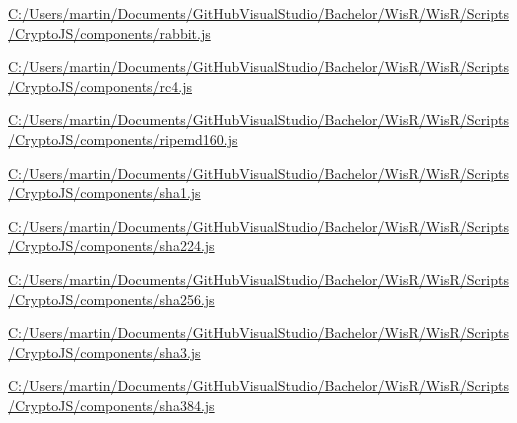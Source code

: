 \begin{DoxyCompactItemize}
\item 
\hyperlink{_c_1_2_users_2martin_2_documents_2_git_hub_visual_studio_2_bachelor_2_wis_r_2_wis_r_2_scripts_2_ceb1bf29ab1bbe291a99a8ab348a650e}{C\+:/\+Users/martin/\+Documents/\+Git\+Hub\+Visual\+Studio/\+Bachelor/\+Wis\+R/\+Wis\+R/\+Scripts/\+Crypto\+J\+S/components/rabbit.\+js}
\item 
\hyperlink{_c_1_2_users_2martin_2_documents_2_git_hub_visual_studio_2_bachelor_2_wis_r_2_wis_r_2_scripts_2_a7aef29039b205bc09138aca000fc420}{C\+:/\+Users/martin/\+Documents/\+Git\+Hub\+Visual\+Studio/\+Bachelor/\+Wis\+R/\+Wis\+R/\+Scripts/\+Crypto\+J\+S/components/rc4.\+js}
\item 
\hyperlink{_c_1_2_users_2martin_2_documents_2_git_hub_visual_studio_2_bachelor_2_wis_r_2_wis_r_2_scripts_2_6d6da44472d2f8d05f238172bf4c2766}{C\+:/\+Users/martin/\+Documents/\+Git\+Hub\+Visual\+Studio/\+Bachelor/\+Wis\+R/\+Wis\+R/\+Scripts/\+Crypto\+J\+S/components/ripemd160.\+js}
\item 
\hyperlink{_c_1_2_users_2martin_2_documents_2_git_hub_visual_studio_2_bachelor_2_wis_r_2_wis_r_2_scripts_2_53d3ce3bfd2c70be05e0b362863774c0}{C\+:/\+Users/martin/\+Documents/\+Git\+Hub\+Visual\+Studio/\+Bachelor/\+Wis\+R/\+Wis\+R/\+Scripts/\+Crypto\+J\+S/components/sha1.\+js}
\item 
\hyperlink{_c_1_2_users_2martin_2_documents_2_git_hub_visual_studio_2_bachelor_2_wis_r_2_wis_r_2_scripts_2_360301f8b63800a46bf88ed98ad6f540}{C\+:/\+Users/martin/\+Documents/\+Git\+Hub\+Visual\+Studio/\+Bachelor/\+Wis\+R/\+Wis\+R/\+Scripts/\+Crypto\+J\+S/components/sha224.\+js}
\item 
\hyperlink{_c_1_2_users_2martin_2_documents_2_git_hub_visual_studio_2_bachelor_2_wis_r_2_wis_r_2_scripts_2_7490cb50c98211c5f30a7e9b91bb1059}{C\+:/\+Users/martin/\+Documents/\+Git\+Hub\+Visual\+Studio/\+Bachelor/\+Wis\+R/\+Wis\+R/\+Scripts/\+Crypto\+J\+S/components/sha256.\+js}
\item 
\hyperlink{_c_1_2_users_2martin_2_documents_2_git_hub_visual_studio_2_bachelor_2_wis_r_2_wis_r_2_scripts_2_4d70dcb797b3afba08404acc55f6e40f}{C\+:/\+Users/martin/\+Documents/\+Git\+Hub\+Visual\+Studio/\+Bachelor/\+Wis\+R/\+Wis\+R/\+Scripts/\+Crypto\+J\+S/components/sha3.\+js}
\item 
\hyperlink{_c_1_2_users_2martin_2_documents_2_git_hub_visual_studio_2_bachelor_2_wis_r_2_wis_r_2_scripts_2_4702e0369f887b57f6c243281e391e4a}{C\+:/\+Users/martin/\+Documents/\+Git\+Hub\+Visual\+Studio/\+Bachelor/\+Wis\+R/\+Wis\+R/\+Scripts/\+Crypto\+J\+S/components/sha384.\+js}
\item 

\end{DoxyCompactItemize}
